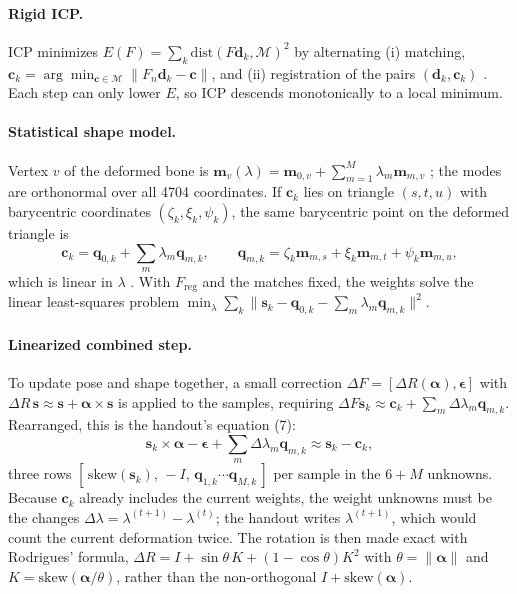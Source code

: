 \documentclass[10pt]{article}
\newcommand{\vect}[1]{\mathbf{#1}}
\newcommand{\F}{F_{\mathrm{reg}}}
\begin{document}
\paragraph{Rigid ICP.} ICP minimizes $E(F)=\sum_k \mathrm{dist}(F\vect d_k,\mathcal M)^2$ by alternating (i) matching, $\vect c_k=\arg\min_{\vect c\in\mathcal M}\|F_n\vect d_k-\vect c\|$, and (ii) registration of the pairs $(\vect d_k,\vect c_k)$ \cite{besl,lecreg1}. Each step can only lower $E$, so ICP descends monotonically to a local minimum.

\paragraph{Statistical shape model.} Vertex $v$ of the deformed bone is $\vect m_v(\lambda)=\vect m_{0,v}+\sum_{m=1}^{M}\lambda_m\vect m_{m,v}$ \cite{handout5}; the modes are orthonormal over all 4704 coordinates. If $\vect c_k$ lies on triangle $(s,t,u)$ with barycentric coordinates $(\zeta_k,\xi_k,\psi_k)$, the same barycentric point on the deformed triangle is
\begin{equation}
\vect c_k=\vect q_{0,k}+\sum_m\lambda_m\vect q_{m,k},\qquad \vect q_{m,k}=\zeta_k\vect m_{m,s}+\xi_k\vect m_{m,t}+\psi_k\vect m_{m,u},
\end{equation}
which is linear in $\lambda$ \cite{pa5notes}. With $\F$ and the matches fixed, the weights solve the linear least-squares problem $\min_\lambda\sum_k\|\vect s_k-\vect q_{0,k}-\sum_m\lambda_m\vect q_{m,k}\|^2$.

\paragraph{Linearized combined step.} To update pose and shape together, a small correction $\Delta F=[\Delta R(\boldsymbol\alpha),\boldsymbol\epsilon]$ with $\Delta R\,\vect s\approx\vect s+\boldsymbol\alpha\times\vect s$ is applied to the samples, requiring $\Delta F\vect s_k\approx\vect c_k+\sum_m\Delta\lambda_m\vect q_{m,k}$. Rearranged, this is the handout's equation (7):
\begin{equation}
\vect s_k\times\boldsymbol\alpha-\boldsymbol\epsilon+\sum_m\Delta\lambda_m\vect q_{m,k}\approx\vect s_k-\vect c_k ,
\end{equation}
three rows $[\,\mathrm{skew}(\vect s_k),\,-I,\,\vect q_{1,k}\cdots\vect q_{M,k}\,]$ per sample in the $6+M$ unknowns. Because $\vect c_k$ already includes the current weights, the weight unknowns must be the changes $\Delta\lambda=\lambda^{(t+1)}-\lambda^{(t)}$; the handout writes $\lambda^{(t+1)}$, which would count the current deformation twice. The rotation is then made exact with Rodrigues' formula, $\Delta R=I+\sin\theta\,K+(1-\cos\theta)K^2$ with $\theta=\|\boldsymbol\alpha\|$ and $K=\mathrm{skew}(\boldsymbol\alpha/\theta)$, rather than the non-orthogonal $I+\mathrm{skew}(\boldsymbol\alpha)$.
\end{document}
